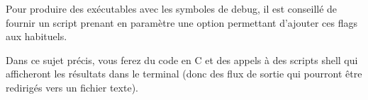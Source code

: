 
\bigskip

\noindent Pour produire des exécutables avec les symboles de debug, il est conseillé de fournir un script  prenant en paramètre une option permettant d'ajouter ces flags aux  habituels.


\smallskip


\smallskip


\bigskip


\smallskip


\smallskip




\vspace*{1cm}

\noindent Dans ce sujet précis, vous ferez du code en C et des appels à des scripts shell qui afficheront les résultats dans le terminal (donc des flux de sortie qui pourront être redirigés vers un fichier texte).






